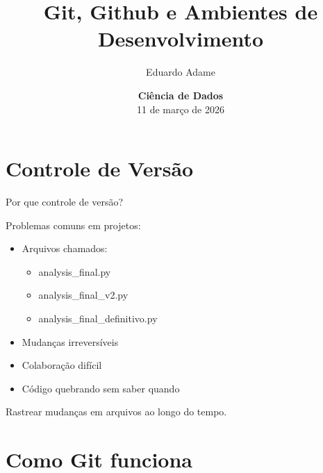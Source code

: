 \documentclass[xcolor=dvipsnames,t,aspectratio=169]{beamer}
\title{Git, Github e Ambientes de Desenvolvimento}
\author{Eduardo Adame}
\date{{\color{nes_dark_purple}\textbf{Ciência de Dados}\\[0.5em] 11 de março de 2026 }}
\begin{document}
\frame[plain]{\titlepage}
\setcounter{framenumber}{0}

\section{Controle de Versão}

\begin{frame}[c]{Por que controle de versão?}

Problemas comuns em projetos:

\begin{itemize}

\item Arquivos chamados:

\begin{itemize}
\item analysis\_final.py
\item analysis\_final\_v2.py
\item analysis\_final\_definitivo.py
\end{itemize}

\item Mudanças irreversíveis
\item Colaboração difícil
\item Código quebrando sem saber quando
\end{itemize}

\begin{display}

Rastrear mudanças em arquivos ao longo do tempo.

\end{display}

\end{frame}


\section{Como Git funciona}
\end{document}
